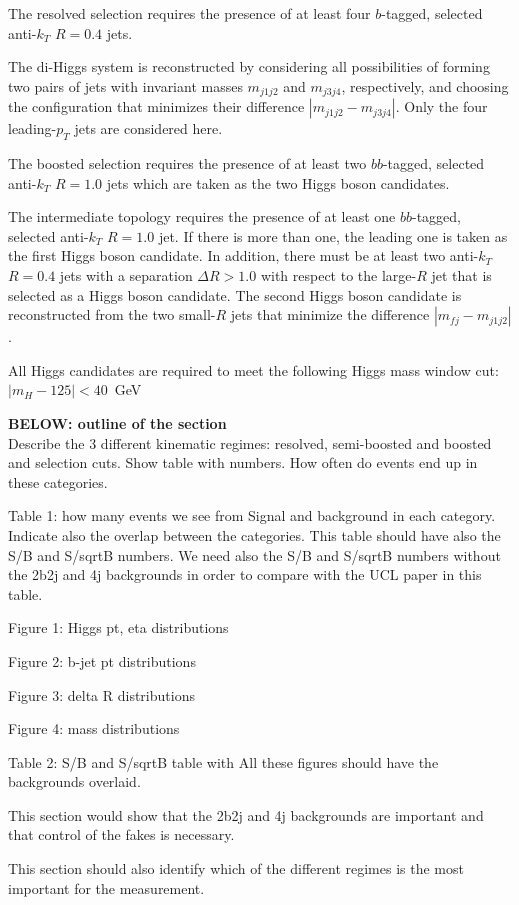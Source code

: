 The resolved selection requires the presence of at least four $b$-tagged, selected anti-$k_T$ $R=0.4$ jets.

The di-Higgs system is reconstructed by considering all possibilities of forming two pairs of jets with invariant masses $m_{j1j2}$ and 
$m_{j3j4}$, respectively, and choosing the configuration that minimizes their difference $|m_{j1j2} - m_{j3j4}|$. Only the four leading-$p_T$ jets
are considered here.


The boosted selection requires the presence of at least two $bb$-tagged, selected anti-$k_T$ $R=1.0$ jets which are taken as the two Higgs boson candidates.


The intermediate topology requires the presence of at least one $bb$-tagged, selected anti-$k_T$ $R = 1.0$ jet. If there is more than one, the leading one is taken as the first Higgs boson candidate. In addition, there must be at least two anti-$k_T$ $R=0.4$ jets with a separation $\Delta R > 1.0$ with respect to the large-$R$ jet
that is selected as a Higgs boson candidate. The second Higgs boson candidate is reconstructed from the two small-$R$ jets that minimize the difference $|m_{fj} - m_{j1j2}|$.


All Higgs candidates are required to meet the following Higgs mass window cut: $|m_{H} - 125| < 40$~GeV

{\bf BELOW: outline of the section}\\


Describe the 3 different kinematic regimes: resolved, semi-boosted and boosted and selection cuts. Show table with numbers. How often do events end up in these categories.

Table 1: how many events we see from Signal and background in each category. Indicate also the overlap between the categories. This table should have also the S/B and S/sqrtB numbers. We need also the S/B and S/sqrtB numbers without the 2b2j and 4j backgrounds in order to compare with the UCL paper in this table.

Figure 1: Higgs pt, eta distributions

Figure 2: b-jet pt distributions

Figure 3: delta R distributions

Figure 4: mass distributions

Table 2: S/B and S/sqrtB table with
All these figures should have the backgrounds overlaid.

This section would show that the 2b2j and 4j backgrounds are important and that control of the fakes is necessary.

This section should also identify which of the different regimes is the most important for the measurement.

